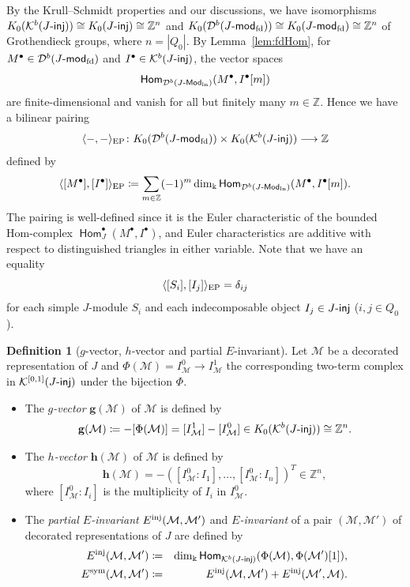 \documentclass[12pt]{amsart}
\theoremstyle{definition}
\newtheorem{definition}[theorem]{Definition}
\theoremstyle{remark}
\numberwithin{equation}{section}
\def\Dcal{\mathcal{D}}
\newcommand{\opname}[1]{\operatorname{\mathsf{#1}}}
\newcommand{\Hom}{\opname{Hom}}
\newcommand{\injc}{\mathchar`-\mathsf{inj}}
\newcommand{\cK}{\mathcal{K}}
\newcommand{\Modln}{\mathchar`-\mathsf{Mod}_{\mathrm{ln}}}
\newcommand{\modfd}{\mathchar`-\mathsf{mod}_{\mathrm{fd}}}
\begin{document}
 By the Krull--Schmidt properties and our discussions, we have isomorphisms $K_0(\cK^b(J\injc))\cong K_0(J\injc) \cong \mathbb{Z}^n$ and $K_0(\Dcal^b(J\modfd))\cong K_0(J\modfd)\cong \mathbb{Z}^n$ of Grothendieck groups, where $n=|Q_0|$.
 By Lemma~\ref{lem:fdHom}, for
$M^\bullet\in\mathcal D^b(J\modfd)$ and
$I^\bullet\in\mathcal K^b(J\injc)$, the vector spaces
\[
\Hom_{\mathcal D^b(J\Modln)}
(M^\bullet,I^\bullet[m])
\]
are finite-dimensional and vanish for all but finitely many
$m\in\mathbb Z$. Hence we have a bilinear pairing
\[
\langle-,-\rangle_{\rm EP}\colon
K_0(\mathcal D^b(J\modfd))
\times K_0(\mathcal K^b(J\injc))
\longrightarrow\mathbb Z
\]
defined by
\[
\langle[M^\bullet],[I^\bullet]\rangle_{\rm EP}
\coloneqq
\sum_{m\in\mathbb Z}(-1)^m
\dim_{\Bbbk}
\Hom_{\mathcal D^b(J\Modln)}
(M^\bullet,I^\bullet[m]).
\]
The pairing is well-defined since it is the Euler characteristic
of the bounded Hom-complex
$\Hom_J^\bullet(M^\bullet,I^\bullet)$, and Euler
characteristics are additive with respect to distinguished
triangles in either variable.
Note that we have an equality
\[\langle[S_i],[I_j]\rangle_{\rm EP}=\delta_{ij}\]
for each simple $J$-module $S_i$ and each indecomposable object $I_j \in J\injc$ ($i, j\in Q_0$).
 \begin{definition}[$g$-vector, $h$-vector and partial $E$-invariant]
    Let $\mathcal{M}$ be a decorated representation of $J$ and $\Phi(\mathcal M)=I_{\mathcal{M}}^0\to I_{\mathcal{M}}^1$ the corresponding two-term complex in $\cK^{[0, 1]}(J\injc)$ under the bijection $\Phi$.
    \begin{itemize}
        \item [(i)]  The \emph{$g$-vector} $\mathbf{g}(\mathcal{M})$ of $\mathcal M$ is defined by
$$\mathbf{g}(\mathcal{M})\coloneqq -[\Phi(\mathcal M)]=[I_{\mathcal M}^1]-[I_{\mathcal M}^0]\in K_0(\cK^b(J\injc))\cong \mathbb Z^n.$$ 
\item[(ii)] The \emph{$h$-vector} $\mathbf{h}(\mathcal{M})$ of $\mathcal M$ is defined by
\[
\mathbf{h}(\mathcal{M})=-([I_{\mathcal{M}}^0\colon I_1],\ldots,[I_{\mathcal{M}}^0\colon I_n])^T\in\mathbb Z^n,
\]
where $[I_{\mathcal{M}}^0\colon I_i]$ is 
the multiplicity of $I_i$ in $I_{\mathcal{M}}^0$.
\item[(iii)] The {\em partial $E$-invariant} $E^{\rm inj}(\mathcal{M},\mathcal{M}')$ and {\em $E$-invariant} of a pair $(\mathcal{M},\mathcal{M}')$ of decorated representations of $J$ are defined by
\begin{eqnarray*}
    E^{\rm inj}(\mathcal{M},\mathcal{M}')&\coloneqq&
    \dim_{\Bbbk} \Hom_{\cK^{b}(J\mathchar`-\mathsf{inj})}(\Phi(\mathcal M),\Phi(\mathcal M')[1]),\\
     E^{\rm sym}(\mathcal{M},\mathcal{M}')&\coloneqq&  E^{\rm inj}(\mathcal{M},\mathcal{M}')+ E^{\rm inj}(\mathcal{M}',\mathcal{M}).
\end{eqnarray*}
    \end{itemize}
 \end{definition}
 
\end{document}
